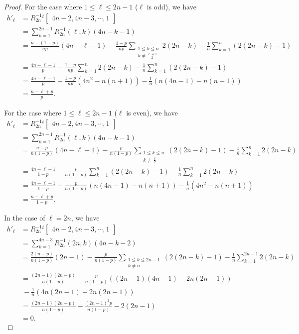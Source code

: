 \documentclass[12pt, leqno]{amsart}
\numberwithin{equation}{section}
\theoremstyle{plain}
\theoremstyle{definition}
\newcommand{\0}{\mathbf{0}}
\begin{document}
\begin{proof}
For the case where $1\leq \ell\leq 2n-1$ ($\ell$ is odd), we have
\begin{align*}
h'_\ell&=
R_{2n}^{-1}{}^t
\begin{bmatrix}
4n-2, 4n-3, \cdots, 1
\end{bmatrix} \\
&=\sum_{k=1}^{2n-1}R_{2n}^{-1}(\ell,k)(4n-k-1)\\
&=\frac{n-(1-p)}{np}(4n-\ell-1)-\frac{1-p}{np}\sum_{\substack{1\leq k\leq n \\ k\neq\frac{\ell+1}{2}}}2(2n-k)-\frac{1}{n}\sum_{k=1}^n(2(2n-k)-1)\\
&=\frac{4n-\ell-1}{p}-\frac{1-p}{np}\sum_{k=1}^n2(2n-k)-\frac{1}{n}\sum_{k=1}^n(2(2n-k)-1)\\
&=\frac{4n-\ell-1}{p}-\frac{1-p}{np}(4n^2-n(n+1))-\frac{1}{n}(n(4n-1)-n(n+1))\\
&=\frac{n-\ell+p}{p}.
\end{align*}

For the case where $1\leq \ell\leq 2n-1$ ($\ell$ is even), we have
\begin{align*}
h'_\ell&=
R_{2n}^{-1}{}^t
\begin{bmatrix}
4n-2, 4n-3, \cdots, 1
\end{bmatrix} \\
&=\sum_{k=1}^{2n-1}R_{2n}^{-1}(\ell,k)(4n-k-1)\\
&=\frac{n-p}{n(1-p)}(4n-\ell-1)-\frac{p}{n(1-p)}\sum_{\substack{1\leq k\leq n \\ k\neq\frac{\ell}{2}}}(2(2n-k)-1)-\frac{1}{n}\sum_{k=1}^n2(2n-k)\\
&=\frac{4n-\ell-1}{1-p}-\frac{p}{n(1-p)}\sum_{k=1}^n(2(2n-k)-1)-\frac{1}{n}\sum_{k=1}^n2(2n-k)\\
&=\frac{4n-\ell-1}{1-p}-\frac{p}{n(1-p)}(n(4n-1)-n(n+1))-\frac{1}{n}(4n^2-n(n+1))\\
&=\frac{n-\ell+p}{1-p}.
\end{align*}

In the case of $\ell=2n$, we have
\begin{align*}
h'_\ell&=
R_{2n}^{-1}{}^t
\begin{bmatrix}
4n-2, 4n-3, \cdots, 1
\end{bmatrix} \\
&=\sum_{k=1}^{4n-3}R_{2n}^{-1}(2n,k)(4n-k-2)\\
&=\frac{2(n-p)}{n(1-p)}(2n-1)-\frac{p}{n(1-p)}\sum_{\substack{1\leq k\leq 2n-1 \\ k\neq n}}(2(2n-k)-1)-\frac{1}{n}\sum_{k=1}^{2n-1}2(2n-k)\\
&=\frac{(2n-1)(2n-p)}{n(1-p)}-\frac{p}{n(1-p)}((2n-1)(4n-1)-2n(2n-1))\\
&~-\frac{1}{n}(4n(2n-1)-2n(2n-1))\\
&=\frac{(2n-1)(2n-p)}{n(1-p)}-\frac{(2n-1)^2p}{n(1-p)}-2(2n-1)\\
&=0.
\end{align*}


\end{proof}
\end{document}
